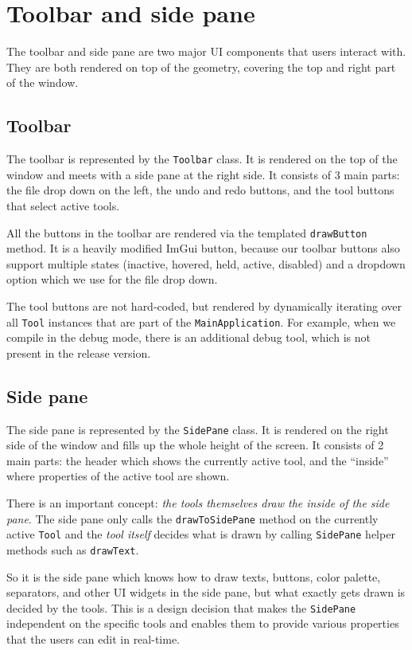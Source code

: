 \section{Toolbar and side pane}

The toolbar and side pane are two major UI components that users interact with.
They are both rendered on top of the geometry, covering the top and right part of the window.

\subsection{Toolbar}

The toolbar is represented by the \texttt{Toolbar} class.
It is rendered on the top of the window and meets with a side pane at the right side.
It consists of 3 main parts: the file drop down on the left, the undo and redo buttons, and the tool buttons that select active tools.

All the buttons in the toolbar are rendered via the templated \texttt{drawButton} method.
It is a heavily modified ImGui button, because our toolbar buttons also support multiple states (inactive, hovered, held, active, disabled) and a dropdown option which we use for the file drop down.

The tool buttons are not hard-coded, but rendered by dynamically iterating over all \texttt{Tool} instances that are part of the \texttt{MainApplication}.
For example, when we compile in the debug mode, there is an additional debug tool, which is not present in the release version.

\subsection{Side pane}

The side pane is represented by the \texttt{SidePane} class.
It is rendered on the right side of the window and fills up the whole height of the screen.
It consists of 2 main parts: the header which shows the currently active tool, and the ``inside'' where properties of the active tool are shown.

There is an important concept: \emph{the tools themselves draw the inside of the side pane}.
The side pane only calls the \texttt{drawToSidePane} method on the currently active \texttt{Tool} and the \emph{tool itself} decides what is drawn by calling \texttt{SidePane} helper methods such as \texttt{drawText}.

So it is the side pane which knows how to draw texts, buttons, color palette, separators, and other UI widgets in the side pane, but what exactly gets drawn is decided by the tools.
This is a design decision that makes the \texttt{SidePane} independent on the specific tools and enables them to provide various properties that the users can edit in real-time.

